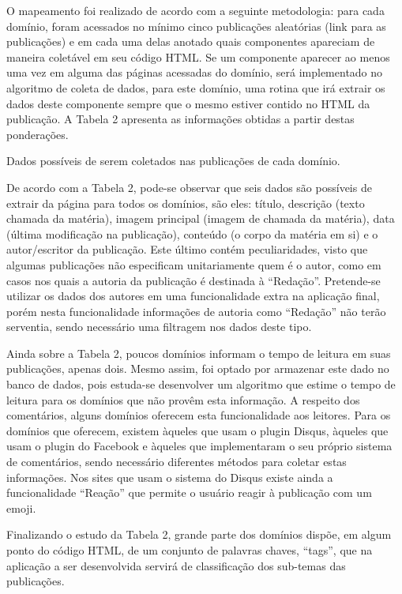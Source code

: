 O mapeamento foi realizado de acordo com a seguinte metodologia: para cada domínio, foram acessados no mínimo cinco publicações aleatórias (link para as publicações) e em cada uma delas anotado quais componentes apareciam de maneira coletável em seu código HTML. Se um componente aparecer ao menos uma vez em alguma das páginas acessadas do domínio, será implementado no algoritmo de coleta de dados, para este domínio, uma rotina que irá extrair os dados deste componente sempre que o mesmo estiver contido no HTML da publicação. A Tabela 2 apresenta as informações obtidas a partir destas ponderações.  

\begin{table}
\noindent\makebox[\textwidth]{%
}
\caption{Dados possíveis de serem coletados nas publicações de cada domínio.}
\end{table}

De acordo com a Tabela 2, pode-se observar que seis dados são possíveis de extrair da página para todos os domínios, são eles: título, descrição (texto chamada da matéria), imagem principal (imagem de chamada da matéria), data (última modificação na publicação), conteúdo (o corpo da matéria em si) e o autor/escritor da publicação. Este último contém peculiaridades, visto que algumas publicações não especificam unitariamente quem é o autor, como em casos nos quais a autoria da publicação é destinada à “Redação”. Pretende-se utilizar os dados dos autores em uma funcionalidade extra na aplicação final, porém nesta funcionalidade informações de autoria como “Redação” não terão serventia, sendo necessário uma filtragem nos dados deste tipo.

Ainda sobre a Tabela 2, poucos domínios informam o tempo de leitura em suas publicações, apenas dois. Mesmo assim, foi optado por armazenar este dado no banco de dados, pois estuda-se desenvolver um algoritmo que estime o tempo de leitura para os domínios que não provêm esta informação. A respeito dos comentários, alguns domínios oferecem esta funcionalidade aos leitores. Para os domínios que oferecem, existem àqueles que usam o plugin Disqus, àqueles que usam o plugin do Facebook e àqueles que implementaram o seu próprio sistema de comentários, sendo necessário diferentes métodos para coletar estas informações. Nos sites que usam o sistema do Disqus existe ainda a funcionalidade “Reação” que permite o usuário reagir à publicação com um emoji.

Finalizando o estudo da Tabela 2, grande parte dos domínios dispõe, em algum ponto do código HTML, de um conjunto de palavras chaves, “tags”, que na aplicação a ser desenvolvida servirá de classificação dos sub-temas das publicações.


